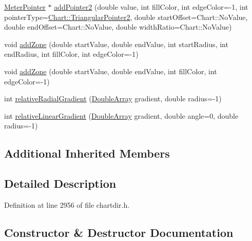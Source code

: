 \begin{DoxyCompactItemize}
\item 
\hyperlink{class_meter_pointer}{Meter\+Pointer} $\ast$ \hyperlink{class_angular_meter_a50942d4bfc5e84f9532784e6d41c9ec1}{add\+Pointer2} (double value, int fill\+Color, int edge\+Color=-\/1, int pointer\+Type=\hyperlink{namespace_chart_a15cfe53d27f5b7a07e25af504b5d10f4afd0736ae83f260af5c7f8093d24448f1}{Chart\+::\+Triangular\+Pointer2}, double start\+Offset=Chart\+::\+No\+Value, double end\+Offset=Chart\+::\+No\+Value, double width\+Ratio=Chart\+::\+No\+Value)
\item 
void \hyperlink{class_angular_meter_ae1f9bf540c796aeb6df17698c0019224}{add\+Zone} (double start\+Value, double end\+Value, int start\+Radius, int end\+Radius, int fill\+Color, int edge\+Color=-\/1)
\item 
void \hyperlink{class_angular_meter_aab2b69fb54f0761d9a2b5c76088570f6}{add\+Zone} (double start\+Value, double end\+Value, int fill\+Color, int edge\+Color=-\/1)
\item 
int \hyperlink{class_angular_meter_a3f2a73796ea3c4aba359042a810b0339}{relative\+Radial\+Gradient} (\hyperlink{class_double_array}{Double\+Array} gradient, double radius=-\/1)
\item 
int \hyperlink{class_angular_meter_a454bd094af77f76a8e1b55ce180a686c}{relative\+Linear\+Gradient} (\hyperlink{class_double_array}{Double\+Array} gradient, double angle=0, double radius=-\/1)
\end{DoxyCompactItemize}
\subsection*{Additional Inherited Members}


\subsection{Detailed Description}


Definition at line 2956 of file chartdir.\+h.



\subsection{Constructor \& Destructor Documentation}
\mbox{\label{class_angular_meter_a5d71988b332dcbe883e7ad8d5abc0696}} 
